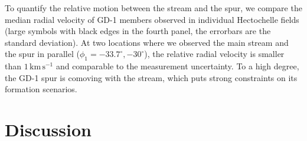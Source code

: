 \documentclass[twocolumn]{aastex63}
\newcommand{\kms}{\ensuremath{\textrm{km}\,\textrm{s}^{-1}}}
\begin{document}
To quantify the relative motion between the stream and the spur, we compare the median radial velocity of GD-1 members observed in individual Hectochelle fields (large symbols with black edges in the fourth panel, the errorbars are the standard deviation).
At two locations where we observed the main stream and the spur in parallel ($\phi_1=-33.7^\circ, -30^\circ$), the relative radial velocity is smaller than $1\,\kms$ and comparable to the measurement uncertainty.
To a high degree, the GD-1 spur is comoving with the stream, which puts strong constraints on its formation scenarios.


\section{Discussion}
\label{sec:discussion}
\end{document}
